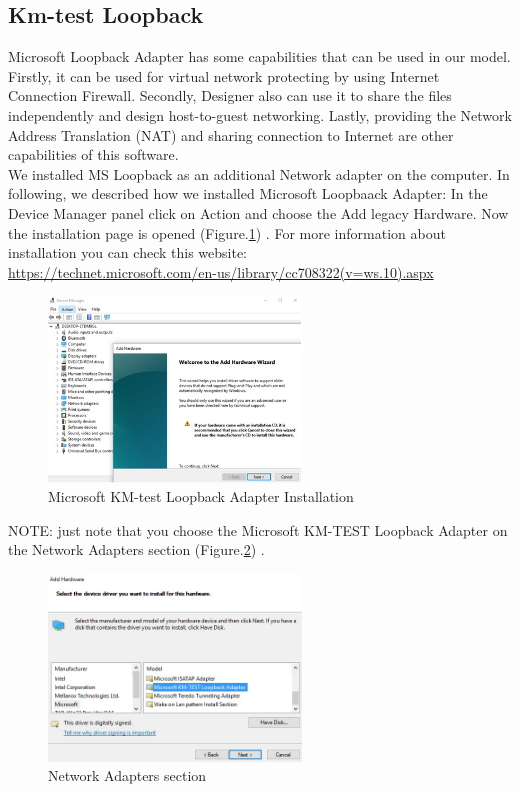 \documentclass{article}
\begin{document}
\subsection{Km-test Loopback}

Microsoft Loopback Adapter has some capabilities that can be used in our model. Firstly, it can be used for virtual network protecting by using Internet Connection Firewall. Secondly, Designer also can use it to share the files independently and design host-to-guest networking. Lastly, providing the Network Address Translation (NAT) and sharing connection to Internet are other capabilities of this software.\\
We installed MS Loopback as an additional Network adapter on the computer. In following, we described how we installed Microsoft Loopbaack Adapter:
In the Device Manager panel click on Action and choose the Add legacy Hardware. Now the installation page is opened (Figure.\ref{fig:KMINS}) . For more information about installation you can check this website:\\
	\url{https://technet.microsoft.com/en-us/library/cc708322(v=ws.10).aspx}


\begin{figure}[H]
	\centering
		\includegraphics[width=0.6\textwidth]{LoopBackIns1.jpg}
	
	\caption{\small Microsoft KM-test Loopback Adapter Installation\newline}
	\label{fig:KMINS}
\end{figure}


NOTE: just note that you choose the Microsoft KM-TEST Loopback Adapter on the Network Adapters section (Figure.\ref{fig:KMINS2}) .


\begin{figure}[H]
	\begin{center}
		\includegraphics[width=0.6\textwidth]{LoopBackIns2.jpg}
	\end{center}
	\caption{\small Network Adapters section \newline}
	\label{fig:KMINS2}
\end{figure}
\end{document}
